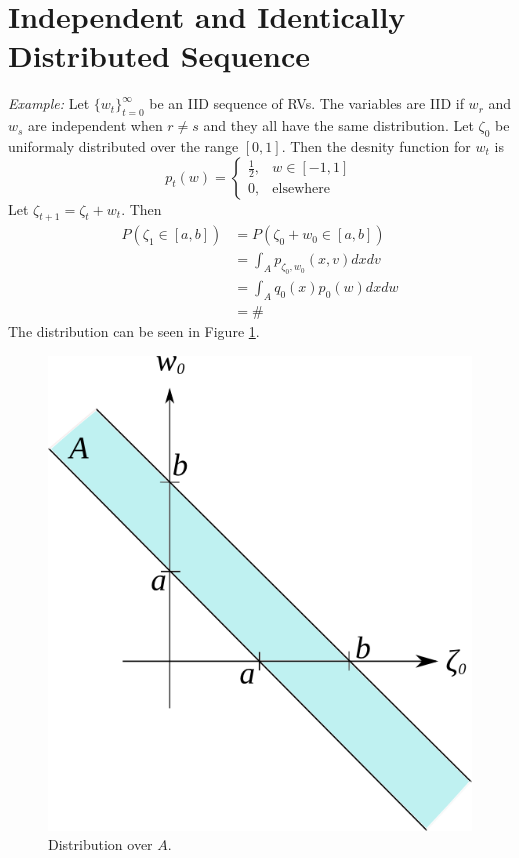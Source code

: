 \documentclass[lecture,12pt,]{pcms-l}
\begin{document}
\section{Independent and Identically Distributed Sequence}
\textit{Example:} Let $\lbrace w_t\rbrace_{t=0}^\infty$ be an IID sequence of RVs. The variables are IID if $w_r$ and $w_s$ are independent when $r\neq s$ and they all have the same distribution. Let $\zeta_0$ be uniformaly distributed over the range $[0,1]$. Then the desnity function for $w_t$ is
$$p_t(w) = \begin{cases} \frac{1}{2}, & w\in[-1,1] \\ 0, & \text{elsewhere} \end{cases}$$
Let $\zeta_{t+1}=\zeta_t+w_t$. Then
\begin{align*}
P(\zeta_1\in[a,b]) &= P(\zeta_0 + w_0\in[a,b]) \\
&= \int_A p_{\zeta_0,w_0}(x,v)dxdv \\
&= \int_A q_0(x)p_0(w)dxdw \\
&= \#
\end{align*}
The distribution can be seen in Figure \ref{fig:02iid}.
\begin{figure}[ht!]
	\centering
	\includegraphics[width=.3\textwidth]{images/02iid}
	\caption{Distribution over $A$.}
	\label{fig:02iid}
\end{figure}
\end{document}
